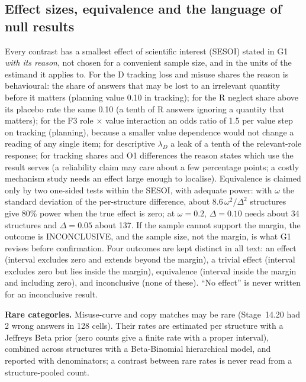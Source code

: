 \documentclass[10pt,a4paper]{article}
\begin{document}
\subsection{Effect sizes, equivalence and the language of null results}
Every contrast has a smallest effect of scientific interest (SESOI) stated in G1 \emph{with its reason}, not chosen
for a convenient sample size, and in the units of the estimand it applies to. For the D tracking loss and misuse shares the
reason is behavioural: the share of answers that may be lost to an irrelevant quantity before it matters (planning
value 0.10 in tracking); for the R neglect share above its placebo rate the same 0.10 (a tenth of R answers ignoring a quantity that
matters); for the F3 role $\times$ value interaction an odds ratio of 1.5 per value step on tracking (planning),
because a smaller value dependence would not change a reading of any single item; for descriptive $\lambda_D$ a leak
of a tenth of the relevant-role response; for tracking shares and O1 differences the reason states which
use the result serves (a reliability claim may care about a few percentage points; a costly mechanism study needs an
effect large enough to localise). Equivalence is claimed only by two one-sided tests within the SESOI, with
adequate power: with $\omega$ the standard deviation of the per-structure difference, about
$8.6\,\omega^2/\Delta^2$ structures give 80\% power when the true effect is zero; at $\omega=0.2$, $\Delta=0.10$
needs about 34 structures and $\Delta=0.05$ about 137. If the sample cannot support the margin, the outcome is
INCONCLUSIVE, and the sample size, not the margin, is what G1 revises before confirmation. Four outcomes are kept
distinct in all text: an effect (interval excludes zero and extends beyond the margin), a trivial effect (interval
excludes zero but lies inside the margin), equivalence (interval inside the margin and including zero), and
inconclusive (none of these). ``No effect'' is never written for an inconclusive result.

\textbf{Rare categories.} Misuse-curve and copy matches may be rare (Stage~14.20 had 2 wrong answers in 128 cells).
Their rates are estimated per structure with a Jeffreys Beta prior (zero counts give a finite rate with a
proper interval), combined across structures with a Beta-Binomial hierarchical model, and reported with
denominators; a contrast between rare rates is never read from a structure-pooled count.
\end{document}
